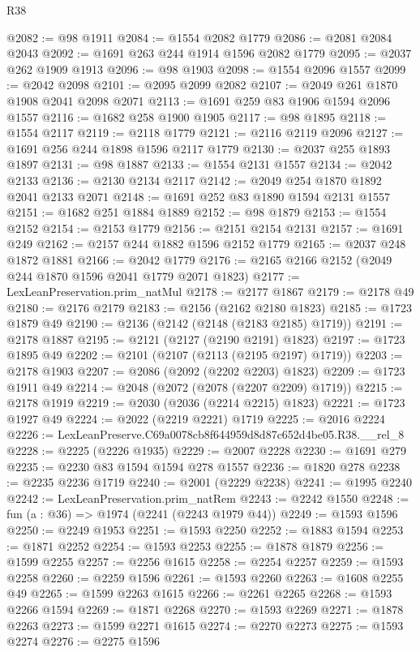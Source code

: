 \begin{lexlean}{R38}
\begin{coremodule}
@2082 := @98 @1911
@2084 := @1554 @2082 @1779
@2086 := @2081 @2084 @2043
@2092 := @1691 @263 @244 @1914 @1596 @2082 @1779
@2095 := @2037 @262 @1909 @1913
@2096 := @98 @1903
@2098 := @1554 @2096 @1557
@2099 := @2042 @2098
@2101 := @2095 @2099 @2082
@2107 := @2049 @261 @1870 @1908 @2041 @2098 @2071
@2113 := @1691 @259 @83 @1906 @1594 @2096 @1557
@2116 := @1682 @258 @1900 @1905
@2117 := @98 @1895
@2118 := @1554 @2117
@2119 := @2118 @1779
@2121 := @2116 @2119 @2096
@2127 := @1691 @256 @244 @1898 @1596 @2117 @1779
@2130 := @2037 @255 @1893 @1897
@2131 := @98 @1887
@2133 := @1554 @2131 @1557
@2134 := @2042 @2133
@2136 := @2130 @2134 @2117
@2142 := @2049 @254 @1870 @1892 @2041 @2133 @2071
@2148 := @1691 @252 @83 @1890 @1594 @2131 @1557
@2151 := @1682 @251 @1884 @1889
@2152 := @98 @1879
@2153 := @1554 @2152
@2154 := @2153 @1779
@2156 := @2151 @2154 @2131
@2157 := @1691 @249
@2162 := @2157 @244 @1882 @1596 @2152 @1779
@2165 := @2037 @248 @1872 @1881
@2166 := @2042 @1779
@2176 := @2165 @2166 @2152 (@2049 @244 @1870 @1596 @2041 @1779 @2071 @1823)
@2177 := LexLeanPreservation.prim_natMul
@2178 := @2177 @1867
@2179 := @2178 @49
@2180 := @2176 @2179
@2183 := @2156 (@2162 @2180 @1823)
@2185 := @1723 @1879 @49
@2190 := @2136 (@2142 (@2148 (@2183 @2185) @1719))
@2191 := @2178 @1887
@2195 := @2121 (@2127 (@2190 @2191) @1823)
@2197 := @1723 @1895 @49
@2202 := @2101 (@2107 (@2113 (@2195 @2197) @1719))
@2203 := @2178 @1903
@2207 := @2086 (@2092 (@2202 @2203) @1823)
@2209 := @1723 @1911 @49
@2214 := @2048 (@2072 (@2078 (@2207 @2209) @1719))
@2215 := @2178 @1919
@2219 := @2030 (@2036 (@2214 @2215) @1823)
@2221 := @1723 @1927 @49
@2224 := @2022 (@2219 @2221) @1719
@2225 := @2016 @2224
@2226 := LexLeanPreserve.C69a0078cb8f644959d8d87c652d4be05.R38.__rel_8
@2228 := @2225 (@2226 @1935)
@2229 := @2007 @2228
@2230 := @1691 @279
@2235 := @2230 @83 @1594 @1594 @278 @1557
@2236 := @1820 @278
@2238 := @2235 @2236 @1719
@2240 := @2001 (@2229 @2238)
@2241 := @1995 @2240
@2242 := LexLeanPreservation.prim_natRem
@2243 := @2242 @1550
@2248 := fun (a : @36) => @1974 (@2241 (@2243 @1979 @44))
@2249 := @1593 @1596
@2250 := @2249 @1953
@2251 := @1593 @2250
@2252 := @1883 @1594
@2253 := @1871 @2252
@2254 := @1593 @2253
@2255 := @1878 @1879
@2256 := @1599 @2255
@2257 := @2256 @1615
@2258 := @2254 @2257
@2259 := @1593 @2258
@2260 := @2259 @1596
@2261 := @1593 @2260
@2263 := @1608 @2255 @49
@2265 := @1599 @2263 @1615
@2266 := @2261 @2265
@2268 := @1593 @2266 @1594
@2269 := @1871 @2268
@2270 := @1593 @2269
@2271 := @1878 @2263
@2273 := @1599 @2271 @1615
@2274 := @2270 @2273
@2275 := @1593 @2274
@2276 := @2275 @1596

\end{coremodule}
\end{lexlean}
